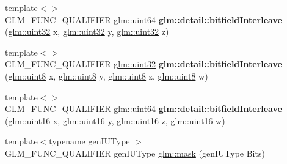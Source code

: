 \begin{DoxyCompactItemize}
\item 
\mbox{\label{bitfield_8inl_a7f6421e0b1180ec986fd91d8eb2d1cc9}} 
{\footnotesize template$<$$>$ }\\G\+L\+M\+\_\+\+F\+U\+N\+C\+\_\+\+Q\+U\+A\+L\+I\+F\+I\+ER \hyperlink{group__gtc__type__precision_gae3632bf9b37da66233d78930dd06378a}{glm\+::uint64} {\bfseries glm\+::detail\+::bitfield\+Interleave} (\hyperlink{group__gtc__type__precision_ga202b6a53c105fcb7e531f9b443518451}{glm\+::uint32} x, \hyperlink{group__gtc__type__precision_ga202b6a53c105fcb7e531f9b443518451}{glm\+::uint32} y, \hyperlink{group__gtc__type__precision_ga202b6a53c105fcb7e531f9b443518451}{glm\+::uint32} z)
\item 
\mbox{\label{bitfield_8inl_ae3f57ec9a2b938eb31978ccb99f85474}} 
{\footnotesize template$<$$>$ }\\G\+L\+M\+\_\+\+F\+U\+N\+C\+\_\+\+Q\+U\+A\+L\+I\+F\+I\+ER \hyperlink{group__gtc__type__precision_ga202b6a53c105fcb7e531f9b443518451}{glm\+::uint32} {\bfseries glm\+::detail\+::bitfield\+Interleave} (\hyperlink{group__gtc__type__precision_ga1a7dcd8aac97cc8020817c94049deff2}{glm\+::uint8} x, \hyperlink{group__gtc__type__precision_ga1a7dcd8aac97cc8020817c94049deff2}{glm\+::uint8} y, \hyperlink{group__gtc__type__precision_ga1a7dcd8aac97cc8020817c94049deff2}{glm\+::uint8} z, \hyperlink{group__gtc__type__precision_ga1a7dcd8aac97cc8020817c94049deff2}{glm\+::uint8} w)
\item 
\mbox{\label{bitfield_8inl_a3ed141c5adbf2e1209ffe2081d98ba4c}} 
{\footnotesize template$<$$>$ }\\G\+L\+M\+\_\+\+F\+U\+N\+C\+\_\+\+Q\+U\+A\+L\+I\+F\+I\+ER \hyperlink{group__gtc__type__precision_gae3632bf9b37da66233d78930dd06378a}{glm\+::uint64} {\bfseries glm\+::detail\+::bitfield\+Interleave} (\hyperlink{group__gtc__type__precision_gad8c2939e1fdd8e5828b31d95c52255d5}{glm\+::uint16} x, \hyperlink{group__gtc__type__precision_gad8c2939e1fdd8e5828b31d95c52255d5}{glm\+::uint16} y, \hyperlink{group__gtc__type__precision_gad8c2939e1fdd8e5828b31d95c52255d5}{glm\+::uint16} z, \hyperlink{group__gtc__type__precision_gad8c2939e1fdd8e5828b31d95c52255d5}{glm\+::uint16} w)
\item 
{\footnotesize template$<$typename gen\+I\+U\+Type $>$ }\\G\+L\+M\+\_\+\+F\+U\+N\+C\+\_\+\+Q\+U\+A\+L\+I\+F\+I\+ER gen\+I\+U\+Type \hyperlink{group__gtc__bitfield_gad7eba518a0b71662114571ee76939f8a}{glm\+::mask} (gen\+I\+U\+Type Bits)

\end{DoxyCompactItemize}
